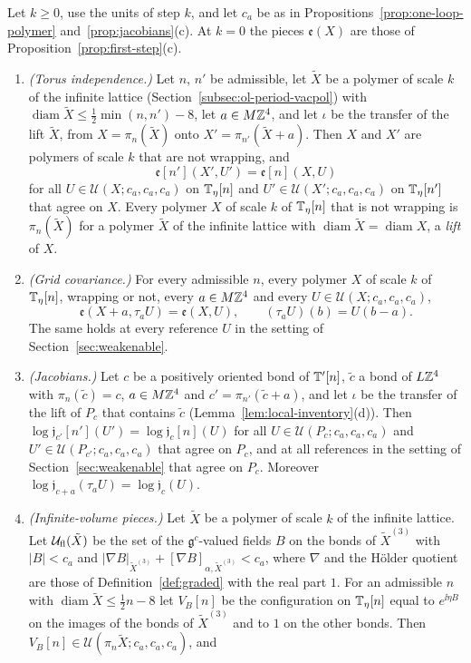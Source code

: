 \begin{proposition}\label{prop:one-loop-local}
Let $k\ge0$, use the units of step $k$, and let $c_a$ be as in Propositions~\ref{prop:one-loop-polymer} and~\ref{prop:jacobians}(c). At $k=0$ the pieces $\mathfrak e(X)$ are those of Proposition~\ref{prop:first-step}(c).
\begin{enumerate}[label=(\alph*)]
\item \emph{(Torus independence.)} Let $n$, $n'$ be admissible, let $\tilde X$ be a polymer of scale $k$ of the infinite lattice (Section~\ref{subsec:ol-period-vacpol}) with $\operatorname{diam}\tilde X\le\frac12\min(n,n')-8$, let $a\in M\mathbb Z^4$, and let $\iota$ be the transfer of the lift $\tilde X$, from $X=\pi_n(\tilde X)$ onto $X'=\pi_{n'}(\tilde X+a)$. Then $X$ and $X'$ are polymers of scale $k$ that are not wrapping, and
\[
\mathfrak e[n'](X',U')=\mathfrak e[n](X,U)
\]
for all $U\in\mathcal U(X;c_a,c_a,c_a)$ on $\mathbb T_\eta[n]$ and $U'\in\mathcal U(X';c_a,c_a,c_a)$ on $\mathbb T_\eta[n']$ that agree on $X$. Every polymer $X$ of scale $k$ of $\mathbb T_\eta[n]$ that is not wrapping is $\pi_n(\tilde X)$ for a polymer $\tilde X$ of the infinite lattice with $\operatorname{diam}\tilde X=\operatorname{diam}X$, a \emph{lift} of $X$.
\item \emph{(Grid covariance.)} For every admissible $n$, every polymer $X$ of scale $k$ of $\mathbb T_\eta[n]$, wrapping or not, every $a\in M\mathbb Z^4$ and every $U\in\mathcal U(X;c_a,c_a,c_a)$,
\[
\mathfrak e(X+a,\tau_aU)=\mathfrak e(X,U),\qquad(\tau_aU)(b)=U(b-a).
\]
The same holds at every reference $U$ in the setting of Section~\ref{sec:weakenable}.
\item \emph{(Jacobians.)} Let $c$ be a positively oriented bond of $\mathbb T'[n]$, $\tilde c$ a bond of $L\mathbb Z^4$ with $\pi_n(\tilde c)=c$, $a\in M\mathbb Z^4$ and $c'=\pi_{n'}(\tilde c+a)$, and let $\iota$ be the transfer of the lift of $P_c$ that contains $\tilde c$ (Lemma~\ref{lem:local-inventory}(d)). Then $\log\mathfrak j_{c'}[n'](U')=\log\mathfrak j_c[n](U)$ for all $U\in\mathcal U(P_c;c_a,c_a,c_a)$ and $U'\in\mathcal U(P_{c'};c_a,c_a,c_a)$ that agree on $P_c$, and at all references in the setting of Section~\ref{sec:weakenable} that agree on $P_c$. Moreover $\log\mathfrak j_{c+a}(\tau_aU)=\log\mathfrak j_c(U)$.
\item \emph{(Infinite-volume pieces.)} Let $\tilde X$ be a polymer of scale $k$ of the infinite lattice. Let $\mathcal U_{\rm fl}(\tilde X)$ be the set of the $\mathfrak g^c$-valued fields $B$ on the bonds of $\tilde X^{(3)}$ with $|B|<c_a$ and $|\nabla B|_{\tilde X^{(3)}}+[\nabla B]_{\alpha,\tilde X^{(3)}}<c_a$, where $\nabla$ and the H\"older quotient are those of Definition~\ref{def:graded} with the real part $1$. For an admissible $n$ with $\operatorname{diam}\tilde X\le\frac12n-8$ let $V_B[n]$ be the configuration on $\mathbb T_\eta[n]$ equal to $e^{\ii\eta B}$ on the images of the bonds of $\tilde X^{(3)}$ and to $1$ on the other bonds. Then $V_B[n]\in\mathcal U(\pi_n\tilde X;c_a,c_a,c_a)$, and

\end{enumerate}
\end{proposition}
